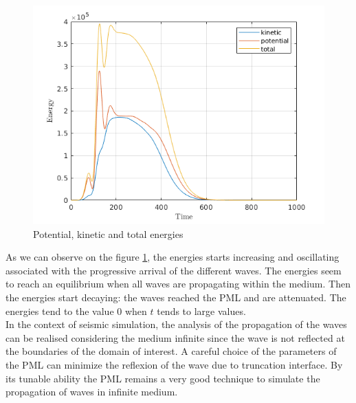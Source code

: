 \begin{figure}[H]
  \centering
  \includegraphics[scale=0.8]{images/Lamb_energy_imp.png}
  \caption{Potential, kinetic and total energies}
  \label{fig:Lamb_energy_imp}
\end{figure}  
As we can observe on the figure \ref{fig:Lamb_energy_imp}, the energies starts increasing and oscillating associated with the progressive arrival of the different waves. The energies seem to reach an equilibrium when all waves are propagating within the medium. Then the energies start decaying: the waves reached the PML and are attenuated. The energies tend to the value $0$ when $t$ tends to large values. \\  
In the context of seismic simulation, the analysis of the propagation of the waves can be realised considering the medium infinite since the wave is not reflected at the boundaries of the domain of interest. A careful choice of the parameters of the PML can minimize the reflexion of the wave due to truncation interface. By its tunable ability the PML remains a very good technique to simulate the propagation of waves in infinite medium.\\

